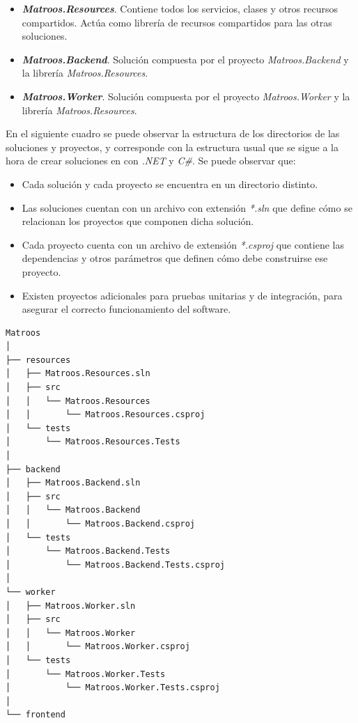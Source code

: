 \begin{itemize}
	\item \textbf{\textit{Matroos.Resources}}. Contiene todos los servicios, clases y otros recursos compartidos. Actúa como librería de recursos compartidos para las otras soluciones.
	\item \textbf{\textit{Matroos.Backend}}. Solución compuesta por el proyecto \textit{Matroos.Backend} y la librería \textit{Matroos.Resources}.
	\item \textbf{\textit{Matroos.Worker}}. Solución compuesta por el proyecto \textit{Matroos.Worker} y la librería \textit{Matroos.Resources}.
\end{itemize}

En el siguiente cuadro se puede observar la estructura de los directorios de las soluciones y proyectos, y corresponde con la estructura usual que se sigue a la hora de crear soluciones en con \textit{.NET} y \textit{C\#}. Se puede observar que:

\begin{itemize}
	\item Cada solución y cada proyecto se encuentra en un directorio distinto.
	\item Las soluciones cuentan con un archivo con extensión \textit{*.sln} que define cómo se relacionan los proyectos que componen dicha solución.
	\item Cada proyecto cuenta con un archivo de extensión \textit{*.csproj} que contiene las dependencias y otros parámetros que definen cómo debe construirse ese proyecto.
	\item Existen proyectos adicionales para pruebas unitarias y de integración, para asegurar el correcto funcionamiento del software.
\end{itemize}

\begin{lstlisting}[style=tree]
Matroos
│
├── resources
│   ├── Matroos.Resources.sln
│   ├── src
│   │   └── Matroos.Resources
│   │       └── Matroos.Resources.csproj
│   └── tests
│       └── Matroos.Resources.Tests
│
├── backend
│   ├── Matroos.Backend.sln
│   ├── src
│   │   └── Matroos.Backend
│   │       └── Matroos.Backend.csproj
│   └── tests
│       └── Matroos.Backend.Tests
│           └── Matroos.Backend.Tests.csproj
│
└── worker
│   ├── Matroos.Worker.sln
│   ├── src
│   │   └── Matroos.Worker
│   │       └── Matroos.Worker.csproj
│   └── tests
│       └── Matroos.Worker.Tests
│           └── Matroos.Worker.Tests.csproj
│
└── frontend
\end{lstlisting}

